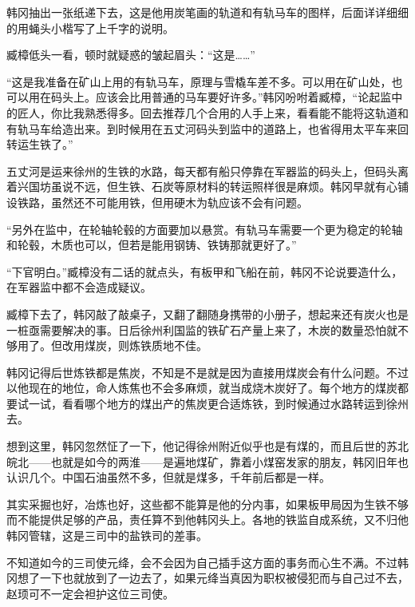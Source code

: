 韩冈抽出一张纸递下去，这是他用炭笔画的轨道和有轨马车的图样，后面详详细细的用蝇头小楷写了上千字的说明。

臧樟低头一看，顿时就疑惑的皱起眉头：“这是……”

“这是我准备在矿山上用的有轨马车，原理与雪橇车差不多。可以用在矿山处，也可以用在码头上。应该会比用普通的马车要好许多。”韩冈吩咐着臧樟，“论起监中的匠人，你比我熟悉得多。回去推荐几个合用的人手上来，看看能不能将这轨道和有轨马车给造出来。到时候用在五丈河码头到监中的道路上，也省得用太平车来回转运生铁了。”

五丈河是运来徐州的生铁的水路，每天都有船只停靠在军器监的码头上，但码头离着兴国坊虽说不远，但生铁、石炭等原材料的转运照样很是麻烦。韩冈早就有心铺设铁路，虽然还不可能用铁，但用硬木为轨应该不会有问题。

“另外在监中，在轮轴轮毂的方面要加以悬赏。有轨马车需要一个更为稳定的轮轴和轮毂，木质也可以，但若是能用钢铸、铁铸那就更好了。”

“下官明白。”臧樟没有二话的就点头，有板甲和飞船在前，韩冈不论说要造什么，在军器监中都不会造成疑议。

臧樟下去了，韩冈敲了敲桌子，又翻了翻随身携带的小册子，想起来还有炭火也是一桩亟需要解决的事。日后徐州利国监的铁矿石产量上来了，木炭的数量恐怕就不够用了。但改用煤炭，则炼铁质地不佳。

韩冈记得后世炼铁都是焦炭，不知是不是就是因为直接用煤炭会有什么问题。不过以他现在的地位，命人炼焦也不会多麻烦，就当成烧木炭好了。每个地方的煤炭都要试一试，看看哪个地方的煤出产的焦炭更合适炼铁，到时候通过水路转运到徐州去。

想到这里，韩冈忽然怔了一下，他记得徐州附近似乎也是有煤的，而且后世的苏北皖北——也就是如今的两淮——是遍地煤矿，靠着小煤窑发家的朋友，韩冈旧年也认识几个。中国石油虽然不多，但就是煤多，千年前后都是一样。

其实采掘也好，冶炼也好，这些都不能算是他的分内事，如果板甲局因为生铁不够而不能提供足够的产品，责任算不到他韩冈头上。各地的铁监自成系统，又不归他韩冈管辖，这是三司中的盐铁司的差事。

不知道如今的三司使元绛，会不会因为自己插手这方面的事务而心生不满。不过韩冈想了一下也就放到了一边去了，如果元绛当真因为职权被侵犯而与自己过不去，赵顼可不一定会袒护这位三司使。

